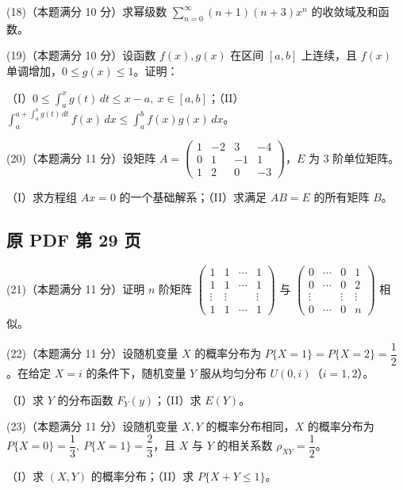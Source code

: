 \documentclass[UTF8,12pt]{ctexart}
\begin{document}
(18)（本题满分 10 分）求幂级数 \(\displaystyle \sum_{n=0}^{\infty}(n+1)(n+3)x^n\) 的收敛域及和函数。


(19)（本题满分 10 分）设函数 \(\displaystyle f(x),\allowbreak g(x)\) 在区间 \(\displaystyle [a,\allowbreak b]\) 上连续，且 \(\displaystyle f(x)\) 单调增加，\(\displaystyle 0\leq g(x)\leq1\)。证明：


（I）\(\displaystyle 0\leq\displaystyle \int_a^x g(t)\,dt\leq x-a,\allowbreak \ x\in[a,\allowbreak b]\)；（II）\(\displaystyle \int_a^{a+\displaystyle \int_a^b g(t)\,dt} f(x)\,dx\leq\displaystyle \int_a^b f(x)g(x)\,dx\)。


(20)（本题满分 11 分）设矩阵 \(\displaystyle A=\begin{pmatrix}1&-2&3&-4\\0&1&-1&1\\1&2&0&-3\end{pmatrix}\)，\(\displaystyle E\) 为 3 阶单位矩阵。


（I）求方程组 \(\displaystyle Ax=0\) 的一个基础解系；（II）求满足 \(\displaystyle AB=E\) 的所有矩阵 \(\displaystyle B\)。


\clearpage

\subsection*{原 PDF 第 29 页}

(21)（本题满分 11 分）证明 \(\displaystyle n\) 阶矩阵 \(\displaystyle \begin{pmatrix}1&1&\cdots&1\\1&1&\cdots&1\\\vdots&\vdots&&\vdots\\1&1&\cdots&1\end{pmatrix}\) 与 \(\displaystyle \begin{pmatrix}0&\cdots&0&1\\0&\cdots&0&2\\\vdots&&\vdots&\vdots\\0&\cdots&0&n\end{pmatrix}\) 相似。


(22)（本题满分 11 分）设随机变量 \(\displaystyle X\) 的概率分布为 \(\displaystyle P\{X=1\}=P\{X=2\}=\dfrac{\displaystyle 1}{\displaystyle 2}\)。在给定 \(\displaystyle X=i\) 的条件下，随机变量 \(\displaystyle Y\) 服从均匀分布 \(\displaystyle U(0,\allowbreak i)\)（\(\displaystyle i=1,\allowbreak 2\)）。


（I）求 \(\displaystyle Y\) 的分布函数 \(\displaystyle F_Y(y)\)；（II）求 \(\displaystyle E(Y)\)。


(23)（本题满分 11 分）设随机变量 \(\displaystyle X,\allowbreak Y\) 的概率分布相同，\(\displaystyle X\) 的概率分布为 \(\displaystyle P\{X=0\}=\dfrac{\displaystyle 1}{\displaystyle 3},\allowbreak \ P\{X=1\}=\dfrac{\displaystyle 2}{\displaystyle 3}\)，且 \(\displaystyle X\) 与 \(\displaystyle Y\) 的相关系数 \(\displaystyle \rho_{XY}=\dfrac{\displaystyle 1}{\displaystyle 2}\)。


（I）求 \(\displaystyle (X,\allowbreak Y)\) 的概率分布；（II）求 \(\displaystyle P\{X+Y\leq1\}\)。


\clearpage
\end{document}
